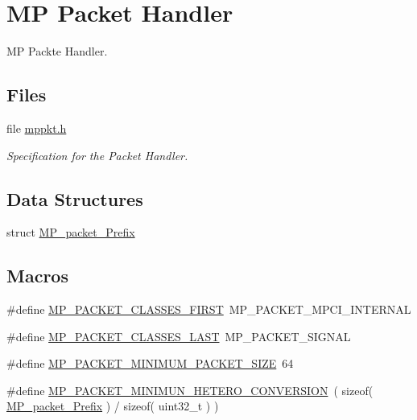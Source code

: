 \hypertarget{group__RTEMSScoreMPPacket}{}\section{MP Packet Handler}
\label{group__RTEMSScoreMPPacket}


MP Packte Handler.  


\subsection*{Files}
\begin{DoxyCompactItemize}
\item 
file \mbox{\hyperlink{mppkt_8h}{mppkt.\+h}}
\begin{DoxyCompactList}\small\item\em Specification for the Packet Handler. \end{DoxyCompactList}\end{DoxyCompactItemize}
\subsection*{Data Structures}
\begin{DoxyCompactItemize}
\item 
struct \mbox{\hyperlink{structMP__packet__Prefix}{M\+P\+\_\+packet\+\_\+\+Prefix}}
\end{DoxyCompactItemize}
\subsection*{Macros}
\begin{DoxyCompactItemize}
\item 
\#define \mbox{\hyperlink{group__RTEMSScoreMPPacket_gae880d4bef40315cdfdad23a2e1d0c1be}{M\+P\+\_\+\+P\+A\+C\+K\+E\+T\+\_\+\+C\+L\+A\+S\+S\+E\+S\+\_\+\+F\+I\+R\+ST}}~M\+P\+\_\+\+P\+A\+C\+K\+E\+T\+\_\+\+M\+P\+C\+I\+\_\+\+I\+N\+T\+E\+R\+N\+AL
\item 
\#define \mbox{\hyperlink{group__RTEMSScoreMPPacket_ga968e1b3a70aac1692b70ff42f9525bc7}{M\+P\+\_\+\+P\+A\+C\+K\+E\+T\+\_\+\+C\+L\+A\+S\+S\+E\+S\+\_\+\+L\+A\+ST}}~M\+P\+\_\+\+P\+A\+C\+K\+E\+T\+\_\+\+S\+I\+G\+N\+AL
\item 
\#define \mbox{\hyperlink{group__RTEMSScoreMPPacket_gadb26ef7629e08a46b4d1caa3a61a6788}{M\+P\+\_\+\+P\+A\+C\+K\+E\+T\+\_\+\+M\+I\+N\+I\+M\+U\+M\+\_\+\+P\+A\+C\+K\+E\+T\+\_\+\+S\+I\+ZE}}~64
\item 
\#define \mbox{\hyperlink{group__RTEMSScoreMPPacket_ga100bacab2178ec9d2d157920a10a9d4f}{M\+P\+\_\+\+P\+A\+C\+K\+E\+T\+\_\+\+M\+I\+N\+I\+M\+U\+N\+\_\+\+H\+E\+T\+E\+R\+O\+\_\+\+C\+O\+N\+V\+E\+R\+S\+I\+ON}}~( sizeof( \mbox{\hyperlink{structMP__packet__Prefix}{M\+P\+\_\+packet\+\_\+\+Prefix}} ) / sizeof( uint32\+\_\+t   ) )
\end{DoxyCompactItemize}
